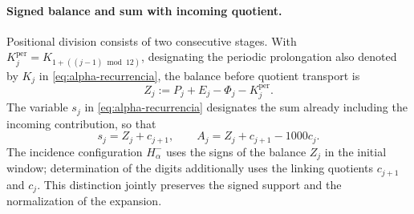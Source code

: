 \paragraph{Signed balance and sum with incoming quotient.}
\label{ampl-alfa-z-s-aclaracion}
Positional division consists of two consecutive stages. With
\(K_j^{\mathrm{per}}=K_{1+((j-1)\bmod12)}\), designating the
periodic prolongation also denoted by \(K_j\) in
\eqref{eq:alpha-recurrencia}, the balance before quotient
transport is
\[
 Z_j:=P_j+E_j-\Phi_j-K_j^{\mathrm{per}}.
\]
The variable $s_j$ in \eqref{eq:alpha-recurrencia} designates the sum already
including the incoming contribution, so that
\[
 s_j=Z_j+c_{j+1},\qquad
 A_j=Z_j+c_{j+1}-1000c_j.
\]
The incidence configuration
$H^-_\alpha$ uses the signs of the balance $Z_j$ in the initial window;
determination of the digits additionally uses the linking quotients
$c_{j+1}$ and $c_j$. This distinction jointly preserves the signed
support and the normalization of the expansion.
